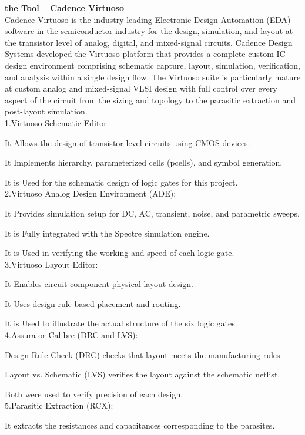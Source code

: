 \documentclass[12pt]{article}
\begin{document}
\large{\textbf{the Tool – Cadence Virtuoso}}\\
\label{int}
Cadence Virtuoso is the industry-leading Electronic Design Automation (EDA) software in the semiconductor industry for the design, simulation, and layout at the transistor level of analog, digital, and mixed-signal circuits. Cadence Design Systems developed the Virtuoso platform that provides a complete custom IC design environment comprising schematic capture, layout, simulation, verification, and analysis within a single design flow.
The Virtuoso suite is particularly mature at custom analog and mixed-signal VLSI design with full control over every aspect of the circuit from the sizing and topology to the parasitic extraction and post-layout simulation.
\\
1.Virtuoso Schematic Editor

It Allows the design of transistor-level circuits using CMOS devices.

It Implements hierarchy, parameterized cells (pcells), and symbol generation.

It is Used for the schematic design of logic gates for this project.
\\
2.Virtuoso Analog Design Environment (ADE):

It Provides simulation setup for DC, AC, transient, noise, and parametric sweeps.

It is Fully integrated with the Spectre simulation engine.

It is Used in verifying the working and speed of each logic gate.
\\
3.Virtuoso Layout Editor:

It Enables circuit component physical layout design.

It Uses design rule-based placement and routing.

It is Used to illustrate the actual structure of the six logic gates.
\\
4.Assura or Calibre (DRC and LVS):

Design Rule Check (DRC) checks that layout meets the manufacturing rules.

Layout vs. Schematic (LVS) verifies the layout against the schematic netlist.

Both were used to verify precision of each design.
\\
5.Parasitic Extraction (RCX):

It extracts the resistances and capacitances corresponding to the parasites.
\end{document}
